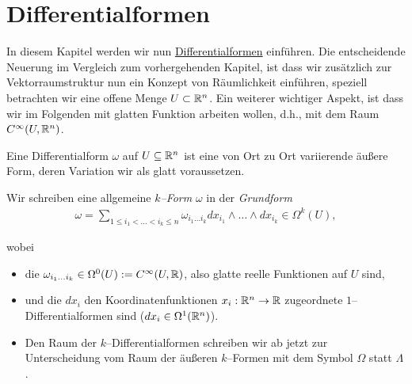 \section{Differentialformen}
\label{\detokenize{vektoranalysis/diffformen:differentialformen}}\label{\detokenize{vektoranalysis/diffformen::doc}}
\par
In diesem Kapitel werden wir nun \href{https://de.wikipedia.org/wiki/Differentialform}{Differentialformen} einführen. Die entscheidende Neuerung im Vergleich zum vorhergehenden Kapitel, ist
dass wir zusätzlich zur Vektorraumstruktur nun ein Konzept von Räumlichkeit einführen, speziell betrachten wir eine offene Menge \(U\subset\mathbb{R}^n\). Ein weiterer wichtiger Aspekt, ist dass wir im Folgenden mit glatten Funktion arbeiten wollen, d.h., mit dem Raum \(C^\infty(U,\mathbb{R}^n)\).

\par
Eine Differentialform \(\omega\) auf \(U\subseteq\mathbb{R}^n\) ist eine von Ort zu Ort variierende äußere Form, deren Variation wir als glatt voraussetzen.

\par
Wir schreiben eine allgemeine \emph{\(k\)–Form} \(\omega\) in der \emph{Grundform}
\begin{align*}
\omega = \sum_{1\leq i_1<\ldots<i_k\leq n}\omega_{i_1\ldots i_k}
dx_{i_1}\wedge\ldots\wedge dx_{i_k}\in\Omega^k(U),
\end{align*}
\par
wobei
\begin{itemize}
\item {} 
\par
die \(\omega_{i_1\ldots i_k}\in \Omega^0(U):=C^\infty(U,\mathbb{R})\), also glatte reelle Funktionen auf \(U\) sind,

\item {} 
\par
und die \(dx_i\) den Koordinatenfunktionen \(x_i:\mathbb{R}^n\to\mathbb{R}\) zugeordnete \(1\)–Differentialformen sind (\(dx_i\in\Omega^1(\mathbb{R}^n)\)).

\item {} 
\par
Den Raum der \(k\)–Differentialformen schreiben wir ab jetzt zur Unterscheidung vom Raum der äußeren \(k\)–Formen mit dem Symbol \(\Omega\) statt \(\Lambda\).

\end{itemize}

